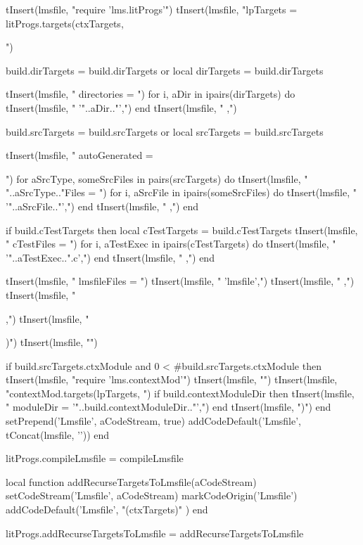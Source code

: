   tInsert(lmsfile, "require 'lms.litProgs'\n")
  tInsert(lmsfile, "lpTargets = litProgs.targets(ctxTargets, {")
  
  build.dirTargets = build.dirTargets or { }
  local dirTargets = build.dirTargets
  
  tInsert(lmsfile, "  directories = {")
  for i, aDir in ipairs(dirTargets) do
    tInsert(lmsfile, "    '"..aDir.."',")
  end
  tInsert(lmsfile, "  },")
  
  build.srcTargets = build.srcTargets or { }
  local srcTargets = build.srcTargets
  
  tInsert(lmsfile, "  autoGenerated = {")
  for aSrcType, someSrcFiles in pairs(srcTargets) do
    tInsert(lmsfile, "    "..aSrcType.."Files = {")
    for i, aSrcFile in ipairs(someSrcFiles) do
      tInsert(lmsfile, "      '"..aSrcFile.."',")
    end
    tInsert(lmsfile, "    },")
  end
  
  if build.cTestTargets then
    local cTestTargets = build.cTestTargets
    tInsert(lmsfile, "    cTestFiles = {")
    for i, aTestExec in ipairs(cTestTargets) do
      tInsert(lmsfile, "      '"..aTestExec..".c',")
    end
    tInsert(lmsfile, "    },")
  end
  
  tInsert(lmsfile, "    lmsfileFiles = {")
  tInsert(lmsfile, "      'lmsfile',")
  tInsert(lmsfile, "    },")
  tInsert(lmsfile, "  },")
  tInsert(lmsfile, "})")
  tInsert(lmsfile, "")
    
  if build.srcTargets.ctxModule and 0 < #build.srcTargets.ctxModule then
    tInsert(lmsfile, "require 'lms.contextMod'")
    tInsert(lmsfile, "")
    tInsert(lmsfile, "contextMod.targets(lpTargets, {")
      if build.contextModuleDir then
        tInsert(lmsfile, "  moduleDir = '"..build.contextModuleDir.."',")
      end
    tInsert(lmsfile, "})")
  end
  setPrepend('Lmsfile', aCodeStream, true)
  addCodeDefault('Lmsfile', tConcat(lmsfile, '\n'))
end

litProgs.compileLmsfile = compileLmsfile

local function addRecurseTargetsToLmsfile(aCodeStream)
  setCodeStream('Lmsfile', aCodeStream)
  markCodeOrigin('Lmsfile')
  addCodeDefault('Lmsfile', "\n\nrecurseTargets(ctxTargets)\n" )
end

litProgs.addRecurseTargetsToLmsfile = addRecurseTargetsToLmsfile

\stopLuaCode

\stopchapter
